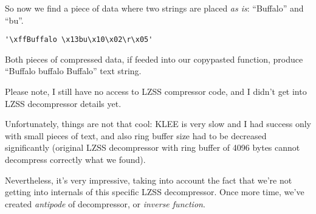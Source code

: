 So now we find a piece of data where two strings are placed \textit{as is}: ``Buffalo'' and ``bu''.

\begin{lstlisting}
'\xffBuffalo \x13bu\x10\x02\r\x05'
\end{lstlisting}

Both pieces of compressed data, if feeded into our copypasted function, produce ``Buffalo buffalo Buffalo'' text string.

Please note, I still have no access to LZSS compressor code, and I didn't get into LZSS decompressor details yet.

Unfortunately, things are not that cool: 
KLEE is very slow and I had success only with small pieces of text, and also ring buffer size had to be decreased significantly
(original LZSS decompressor with ring buffer of 4096 bytes cannot decompress correctly what we found).

Nevertheless, it's very impressive, taking into account the fact that we're not getting into internals of this specific LZSS decompressor.
Once more time, we've created \textit{antipode} of decompressor, or \textit{inverse function}.

